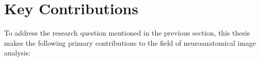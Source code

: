 


\section{Key Contributions}

To address the research question mentioned in the previous section, this thesis makes the following primary contributions to the field of neuroanatomical image analysis:

